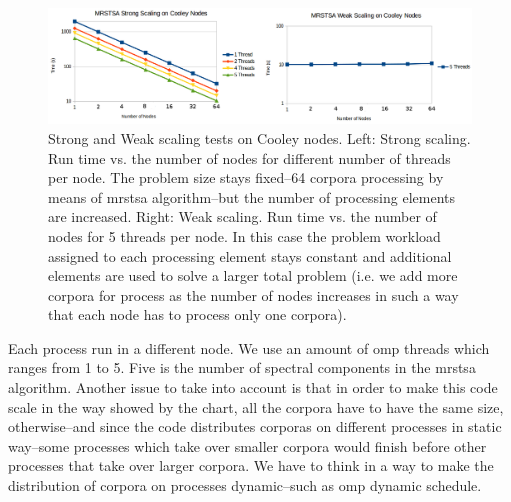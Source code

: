 \documentclass[11pt,a4paper]{article}
\begin{document}
\begin{figure}[h!]
    \centering
    \includegraphics[width=1.0\textwidth]{MRSTSA_Scaling.png}
    \caption{Strong and Weak scaling tests on Cooley nodes. Left: Strong scaling. Run time vs. the number of nodes for different number of threads per node. The problem size stays fixed--64 corpora processing by means of \gls{mrstsa} algorithm--but the number of processing elements are increased. Right: Weak scaling. Run time vs. the number of nodes for 5 threads per node. In this case the problem workload assigned to each processing element stays constant and additional elements are used to solve a larger total problem (i.e. we add more corpora for process as the number of nodes increases in such a way that each node has to process only one corpora).}
    \label{fig:MRSTSA_Scaling}
\end{figure}

Each process run in a different node. We use an amount of \gls{omp} threads which ranges from 1 to 5. Five is the number of spectral components in the \gls{mrstsa} algorithm. Another issue to take into account is that in order to make this code scale in the way showed by the chart, all the corpora have to have the same size, otherwise--and since the code distributes corporas on different processes in static way--some processes which take over smaller corpora would finish before other processes that take over larger corpora. We have to think in a way to make the distribution of corpora on processes dynamic--such as \gls{omp} dynamic schedule.
\end{document}
